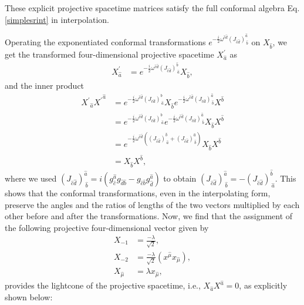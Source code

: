 \documentclass[journal,article,submit,pdftex,moreauthors]{Definitions/mdpi}
\begin{document}
These explicit projective spacetime matrices satisfy the full conformal algebra Eq.\eqref{simplesrint} in interpolation. 

Operating the exponentiated conformal transformations $e^{-\frac{i}{2}\omega^{\hat{c}\hat{d}}(J_{\hat{c}\hat{d}})^{\hat{a}}_{~\hat{b}}}$ on $X_{\hat{b}}$, we get the transformed four-dimensional projective spacetime $X^{\prime}_{\hat{a}}$ as 
\begin{align}
\label{exponential-conformal-tranf}
  X^{\prime}_{\hat{a}}&=e^{-\frac{i}{2}\omega^{\hat{c}\hat{d}}(J_{\hat{c}\hat{d}})^{\hat{b}}_{~\hat{a}}}X_{\hat{b}},
\end{align}
and the inner product
\begin{align}
{X^{\prime}}_{\hat{a}}{X^{\prime}}^{\hat{a}} &= 
e^{-\frac{i}{2}\omega^{\hat{c}\hat{d}}(J_{\hat{c}\hat{d}})^{\hat{b}}_{~\hat{a}}}X_{\hat{b}}e^{-\frac{i}{2}\omega^{\hat{c}\hat{d}}(J_{\hat{c}\hat{d}})^{\hat{a}}_{~\hat{b}}}X^{\hat{b}}\nonumber\\
&= e^{-\frac{i}{2}\omega^{\hat{c}\hat{d}}(J_{\hat{c}\hat{d}})^{\hat{b}}_{~\hat{a}}}e^{-\frac{i}{2}\omega^{\hat{c}\hat{d}}(J_{\hat{c}\hat{d}})^{\hat{a}}_{~\hat{b}}}X_{\hat{b}}X^{\hat{b}}\nonumber\\
&= e^{-\frac{i}{2}\omega^{\hat{c}\hat{d}}((J_{\hat{c}\hat{d}})^{\hat{b}}_{~\hat{a}}+(J_{\hat{c}\hat{d}})^{\hat{a}}_{~\hat{b}})}X_{\hat{b}}X^{\hat{b}}\nonumber\\
&= X_{\hat{b}}X^{\hat{b}},
\end{align}
where we used $(J_{{\hat{c}}{\hat{d}}})^{\hat{a}}_{~\hat{b}}=i(g_{\hat{c}}^{\hat{a}} g_{{\hat{d}}{\hat{b}}}-g_{{\hat{c}}{\hat{b}}} g_{\hat{d}}^{\hat{a}})$ to obtain $(J_{\hat{c}\hat{d}})^{\hat{a}}_{~\hat{b}}=-(J_{\hat{c}\hat{d}})^{\hat{b}}_{~\hat{a}}$.
This shows that the conformal transformations, even in the interpolating form, preserve the angles and the ratios of lengths of the two vectors multiplied by each other before and after the transformations. Now, we find that the assignment of the following projective four-dimensional vector given by 
\begin{align}
    {X}_{-1}&=\frac{-\lambda}{\sqrt{2}}, \nonumber\\
    {X}_{-2}&=\frac{-\lambda}{\sqrt{2}}(x^{\hat{\mu}}x_{\hat{\mu}}), \nonumber \\
     {X}_{\hat{\mu}}&=\lambda x_{\hat{\mu}},\label{X-mu}
\end{align}
provides the lightcone of the projective spacetime, i.e., ${X}_{\hat{a}}{X}^{\hat{a}}=0$, as explicitly shown below: 
\end{document}
